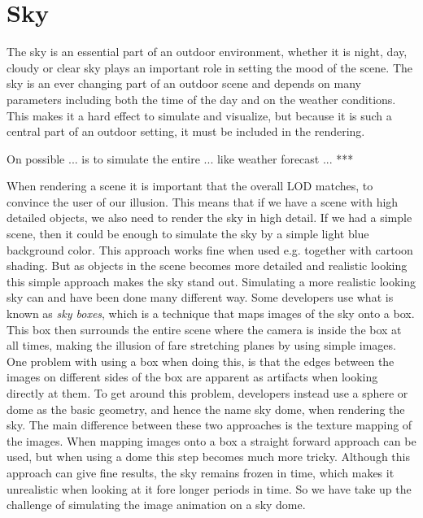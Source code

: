 
\chapter{Sky}
The sky is an essential part of an outdoor environment, whether it is
night, day, cloudy or clear sky plays an important role in setting the
mood of the scene. 
The sky is an ever changing part of an outdoor scene
and depends on many parameters including both the time of the day and
on the weather conditions.
%
This makes it a hard effect to simulate and visualize, but because it
is such a central part of an outdoor setting, it must be included in
the rendering.

On possible ... is to simulate the entire ... like weather forecast
... ***

When rendering a scene it is important that the overall LOD
matches, to convince the user of our illusion. This means that if we
have a scene with  high detailed objects, we also need to render the
sky in high detail. If we had a simple scene, then it could be enough to
simulate the sky by a simple light blue background color. This
approach works fine when used e.g. together with cartoon shading. But
as objects in the scene becomes more detailed and realistic looking
this simple approach makes the sky stand out. 
%
Simulating a more realistic looking sky can and have been done many
different way. Some developers use what is known as \emph{sky boxes},
which is a technique that maps images of the sky onto a box. This box
then surrounds the entire scene where the camera is inside the box at
all times, making the illusion of fare stretching planes by using
simple images.
%
One problem with using a box when doing this, is that the edges
between the images on different sides of the box are apparent as
artifacts when looking directly at them. To get around this problem,
developers instead use a sphere or dome as the basic geometry, and
hence the name sky dome, when rendering the sky. The main difference
between these two approaches is the texture mapping of the
images. When mapping images onto a box a straight forward approach can
be used, but when using a dome this step becomes much more tricky.
%
Although this approach can give fine results, the sky remains frozen
in time, which makes it unrealistic when looking at it fore longer
periods in time. 
%
So we have take up the challenge of simulating the image animation on
a sky dome.

